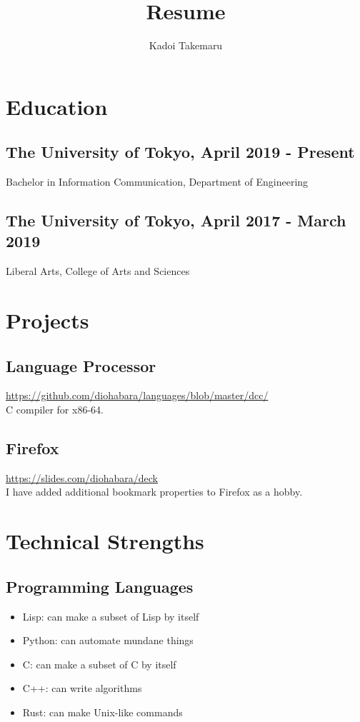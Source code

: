 \documentclass{article}
\title{Resume}
\author{Kadoi Takemaru}
\begin{document}
\maketitle

\section*{Education}
    \subsection*{The University of Tokyo, April 2019 - Present}
        Bachelor in Information Communication, Department of Engineering
    \subsection*{The University of Tokyo, April 2017 - March 2019}
        Liberal Arts, College of Arts and Sciences

\section*{Projects}
    \subsection*{Language Processor}
        \url{https://github.com/diohabara/languages/blob/master/dcc/}
        \\ C compiler for x86-64.

    \subsection*{Firefox}
        \url{https://slides.com/diohabara/deck}
        \\ I have added additional bookmark properties to Firefox as a hobby.

\section*{Technical Strengths}
    \subsection*{Programming Languages}
        \begin{itemize}
            \item Lisp: can make a subset of Lisp by itself
            \item Python: can automate mundane things
            \item C: can make a subset of C by itself
            \item C++: can write algorithms
            \item Rust: can make Unix-like commands
        \end{itemize}
\end{document}
